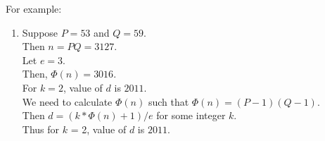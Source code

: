 \documentclass[../../lecture_notes.tex]{subfiles}
\begin{document}
For example:
\begin{enumerate}
\item[]
	Suppose $P = 53$ and $Q = 59$. \\
	Then $n = PQ = 3127$. \\
	Let $e = 3$. \\
	Then,  $\Phi(n) = 3016$. \\
	For $k = 2$, value of $d$ is $2011$. \\
	We need to calculate $\Phi(n)$ such that $\Phi(n) = (P-1)(Q-1)$. \\
	Then $d = (k*\Phi(n) + 1) / e$ for some integer $k$. \\
	Thus for $k$ = 2, value of $d$ is $2011$.
\end{enumerate}
\end{document}
